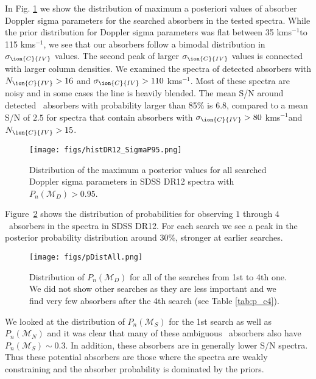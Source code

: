 \documentclass[fleqn,usenatbib]{mnras}
\newcommand{\civ}{\ion{C}{IV}}
\newcommand{\nciv}{N_{\civ}} %
\newcommand{\sciv}{\sigma_{\civ}}
\newcommand{\kms}{kms$^{-1}$} %
\newcommand{\model}{\mathcal{M}}
\newcommand{\rmon}[1]{\textcolor{rez}{[\bf RM: #1]}}
\begin{document}
In Fig. \ref{fig:DR12Sigma} we show the distribution
of maximum a posteriori values of absorber
Doppler sigma parameters for the searched absorbers in the tested spectra. While
the prior distribution for Doppler sigma parameters was flat between 35 \kms to
115 \kms, we see that our absorbers follow a bimodal distribution in
$\sciv$ values. The second peak of larger $\sciv$ values is connected with
larger column densities. We examined the spectra of detected
absorbers with $\nciv > 16$ and $\sciv > 110$ \kms. Most of these spectra are noisy and
in some cases the line is heavily blended.
The mean S/N around detected \civ\ absorbers with probability larger than
85\% is $6.8$, compared to a mean S/N of $2.5$ for spectra
that contain absorbers with $\sciv>80$ \kms and $\nciv>15$. %

\begin{figure}
\texttt{[image: figs/histDR12\_SigmaP95.png]}
\caption{Distribution of the maximum a posterior values for all
 searched Doppler sigma parameters
in SDSS DR12 spectra with $P_n(\model_D)>0.95$. }
\label{fig:DR12Sigma}
\end{figure}

    Figure~\ref{fig:distp1} shows the distribution of probabilities for observing
    $1$ through $4$ \civ\ absorbers in the spectra in SDSS DR12.
    For each search we see a peak in the posterior probability distribution around 30\%, stronger at earlier searches.
    \begin{figure}
      \texttt{[image: figs/pDistAll.png]}
      \caption{Distribution of $P_n(\model_D)$ for all of the searches from 1st to 4th one.
      We did not show other searches as they are less important and we find very few absorbers after
      the 4th search (see Table \ref{tab:p_c4}).}
      \label{fig:distp1}
    \end{figure}
    We looked at the distribution of $P_n(\model_S)$ for the 1st search as well as
    $P_n(\model_{N})$ and it was clear that many of these ambiguous \civ~absorbers
    also have $P_n(\model_S) \sim 0.3$. In addition, these
    absorbers are in generally lower S/N spectra. Thus these potential absorbers are those where the spectra are weakly constraining and the absorber probability is dominated by the priors.
\end{document}
